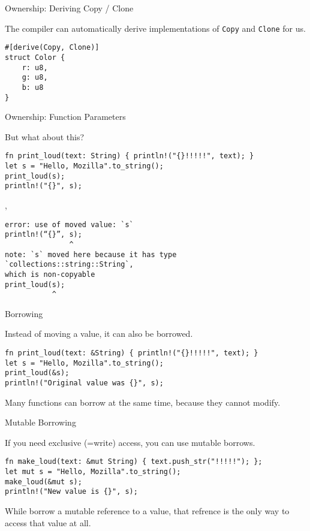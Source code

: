 
\begin{frame}[fragile]{Ownership: Deriving Copy / Clone}

The compiler can automatically derive implementations of \texttt{Copy} and
\texttt{Clone} for us.

\begin{verbatim}
#[derive(Copy, Clone)]
struct Color {
    r: u8,
    g: u8,
    b: u8
}
\end{verbatim}

\end{frame}


\begin{frame}[fragile]{Ownership: Function Parameters}

But what about this?

\begin{verbatim}
fn print_loud(text: String) { println!("{}!!!!!", text); }
let s = "Hello, Mozilla".to_string();
print_loud(s);
println!("{}", s);
\end{verbatim}

\pause
\sep

\begin{verbatim}
error: use of moved value: `s`
println!(“{}”, s);
               ^
note: `s` moved here because it has type `collections::string::String`,
which is non-copyable
print_loud(s);
           ^
\end{verbatim}

\end{frame}


\begin{frame}[fragile]{Borrowing}

Instead of moving a value, it can also be borrowed.

\begin{verbatim}
fn print_loud(text: &String) { println!("{}!!!!!", text); }
let s = "Hello, Mozilla".to_string();
print_loud(&s);
println!("Original value was {}", s);
\end{verbatim}

Many functions can borrow at the same time, because they cannot modify.

\end{frame}


\begin{frame}[fragile]{Mutable Borrowing}

If you need exclusive (=write) access, you can use mutable borrows.

\begin{verbatim}
fn make_loud(text: &mut String) { text.push_str("!!!!!"); };
let mut s = "Hello, Mozilla".to_string();
make_loud(&mut s);
println!("New value is {}", s);
\end{verbatim}

While borrow a mutable reference to a value, that refrence is the only way to
access that value at all.
\end{frame}

